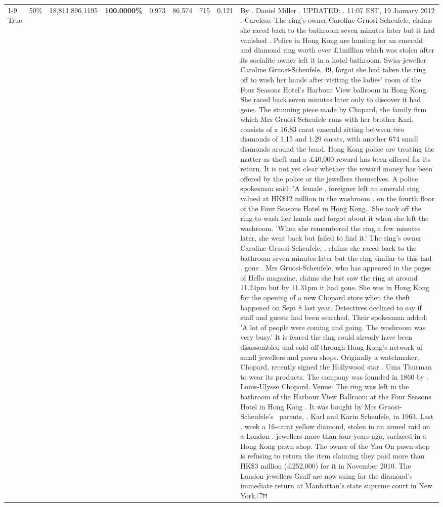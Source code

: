 \begin{table}[H]
\begin{tabular}{lllrlllll}
\cline{1-9} \cline{2-9}
True & 50\% & 18,811,896.1195 & \bfseries \color{red} 100.0000\% & 0.973 & 86.574 & 715 & 0.121 & By . Daniel Miller . UPDATED: . 11:07 EST, 19 January 2012 . Careless: The ring's owner Caroline Gruosi-Scheufele, claims she raced back to the bathroom seven minutes later but it had vanished . Police in Hong Kong are hunting for an emerald and diamond ring worth over £1million which was stolen after its socialite owner left it in a hotel bathroom. Swiss jeweller Caroline Gruosi-Scheufele, 49, forgot she had taken the ring off to wash her hands after visiting the ladies' room of the Four Seasons Hotel's Harbour View ballroom in Hong Kong. She raced back seven minutes later only to discover it had gone. The stunning piece made by Chopard, the family firm which Mrs Gruosi-Scheufele runs with her brother Karl, consists of a 16.83 carat emerald sitting between two diamonds of 1.15 and 1.29 carats, with another 674 small diamonds around the band. Hong Kong police are treating the matter as theft and a £40,000 reward has been offered for its return. It is not yet clear whether the reward money has been offered by the police or the jewellers themselves. A police spokesman said: 'A female . foreigner left an emerald ring valued at HK\$12 million in the washroom . on the fourth floor of the Four Seasons Hotel in Hong Kong. 'She took off the ring to wash her hands and forgot about it when she left the washroom. 'When she remembered the ring a few minutes later, she went back but failed to find it.' The ring's owner Caroline Gruosi-Scheufele, . claims she raced back to the bathroom seven minutes later but the ring similar to this had . gone . Mrs Gruosi-Scheufele, who has appeared in the pages of Hello magazine, claims she last saw the ring at around 11.24pm but by 11.31pm it had gone. She was in Hong Kong for the opening of a new Chopard store when the theft happened on Sept 8 last year. Detectives declined to say if staff and guests had been searched. Their spokesman added: 'A lot of people were coming and going. The washroom was very busy.' It is feared the ring could already have been disassembled and sold off through Hong Kong's network of small jewellers and pawn shops. Originally a watchmaker, Chopard, recently signed the Hollywood star . Uma Thurman to wear its products. The company was founded in 1860 by . Louis-Ulysse Chopard. Venue: The ring was left in the bathroom of the Harbour View Ballroom at the Four Seasons Hotel in Hong Kong . It was bought by Mrs Gruosi-Scheufele's  parents, . Karl and Karin Scheufele, in 1963. Last . week a 16-carat yellow diamond, stolen in an armed raid on a London . jewellers more than four years ago, surfaced in a Hong Kong pawn shop. The owner of the Yau On pawn shop is refusing to return the item claiming they paid more than HK\$3 million (£252,000) for it in November 2010. The London jewellers Graff are now suing for the diamond’s immediate return at Manhattan’s state supreme court in New York.ীণ \\

\end{tabular}
\end{table}
